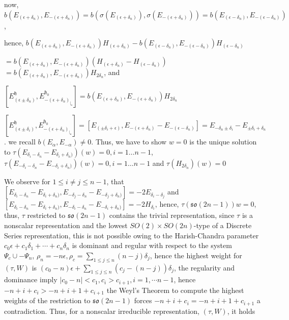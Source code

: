 \documentclass[12pt]{amsart}
\theoremstyle{definition}
\theoremstyle{remark}
\newcommand{\h}{\mathfrak{h}}
\renewcommand{\u}{{\mathfrak u}}
\numberwithin{equation}{section}
\begin{document}
now, $b(E_{(\epsilon + \delta_n)},  E_{-(\epsilon +\delta_n)})=b(\sigma(E_{(\epsilon + \delta_n)}), \sigma( E_{-(\epsilon +\delta_n)}))= b(E_{(\epsilon - \delta_n)},E_{-(\epsilon - \delta_n)})$,

hence, $ b(E_{(\epsilon + \delta_n)},  E_{-(\epsilon +\delta_n)})H_{(\epsilon + \delta_n)}-b(E_{(\epsilon - \delta_n)},E_{-(\epsilon - \delta_n)})H_{(\epsilon -\delta_n)}$

 $= b(E_{(\epsilon + \delta_n)},  E_{-(\epsilon +\delta_n)})(H_{(\epsilon + \delta_n)}-H_{(\epsilon -\delta_n)})$
 $=  b(E_{(\epsilon + \delta_n)},  E_{-(\epsilon +\delta_n)}) H_{2\delta_n} $, and

$[E_{(\epsilon \pm \delta_n)}^\h, E_{-(\epsilon +\delta_n)_{\vert_\u}}^{\h_0}]= b(E_{(\epsilon + \delta_n)},  E_{-(\epsilon +\delta_n)}) H_{2\delta_n} $

 $[E_{(\epsilon \pm \delta_i)}^\h, E_{-(\epsilon +\delta_n)_{\vert_\u}}^{\h_0}]=[E_{(\pm\delta_i + \epsilon)} , E_{-(\epsilon +\delta_n)}-E_{-(\epsilon -\delta_n)}]= E_{-\delta_n\pm \delta_i}- E_{\pm\delta_i +\delta_n}$.  we recall $b(E_\alpha, E_{-\alpha})\not= 0$.  Thus, we have to show
$w=0$ is the unique solution to  $\tau(E_{\delta_i-\delta_n}- E_{\delta_i +\delta_n)})(w)=0, i=1 \dots n-1$, $\tau(E_{-\delta_i-\delta_n}- E_{-\delta_i +\delta_n)})(w)=0, i=1 \dots n-1$ and
  $  \tau(H_{2\delta_n})(w)=0 $

  \medskip
We observe for $1\leq i\not= j\leq n-1$, that $[E_{\delta_i-\delta_n}- E_{\delta_i +\delta_n)}, E_{-\delta_j-\delta_n}- E_{-\delta_j +\delta_n)}]=-2E_{\delta_i -\delta_j}$ and $[E_{\delta_i-\delta_n}- E_{\delta_i +\delta_n)}, E_{-\delta_i-\delta_n}- E_{-\delta_i +\delta_n)}]=-2H_{\delta_i }$, hence, $\tau(\mathfrak{so}(2n-1))w=0$, thus, $\tau$ restricted to $\mathfrak{so}(2n-1)$ contains the trivial representation, since $\tau$ is a nonscalar representation and the lowest $SO(2)\times SO(2n)$-type of a Discrete Series representation, this is not possible owing to the Harish-Chandra parameter $c_0\epsilon +c_1 \delta_1+\cdots +c_n \delta_n$ is dominant and regular with respect to the system $\Psi_c \cup -\Psi_n$, $\rho_n =-n\epsilon, \rho_c =\sum_{1\leq j \leq n} (n-j) \delta_j$, hence the highest weight for $(\tau,W)$ is $(c_0-n)\epsilon + \sum_{1\leq j \leq n} (c_j-(n-j)) \delta_j $, the regularity and dominance imply $\vert c_0 -n\vert <c_1, c_i>c_{i+1}, i=1, \cdots n-1$, hence $-n+i+c_i>-n+i+1+c_{i+1}$ the Weyl's Theorem to compute the highest weights of the restriction to $\mathfrak{so}(2n-1)$ forces $-n+i+c_i=-n+i+1+c_{i+1}$ a contradiction. Thus, for a  nonscalar irreducible representation, $(\tau,W)$,  it holds
\end{document}
